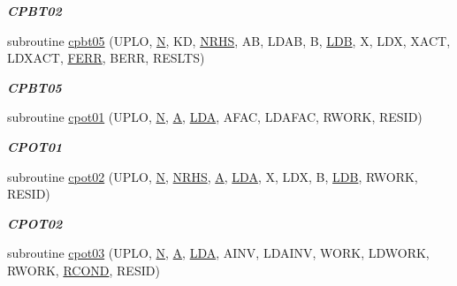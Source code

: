 \begin{DoxyCompactItemize}
\begin{DoxyCompactList}\small\item\em {\bfseries C\+P\+B\+T02} \end{DoxyCompactList}\item 
subroutine \hyperlink{group__complex__lin_gad208935300b83a1e0a41843d6a3c6e70}{cpbt05} (U\+P\+L\+O, \hyperlink{polmisc_8c_a0240ac851181b84ac374872dc5434ee4}{N}, K\+D, \hyperlink{example__user_8c_aa0138da002ce2a90360df2f521eb3198}{N\+R\+H\+S}, A\+B, L\+D\+A\+B, B, \hyperlink{example__user_8c_a50e90a7104df172b5a89a06c47fcca04}{L\+D\+B}, X, L\+D\+X, X\+A\+C\+T, L\+D\+X\+A\+C\+T, \hyperlink{superlu__enum__consts_8h_af00a42ecad444bbda75cde1b64bd7e72a78fd14d7abebae04095cfbe02928f153}{F\+E\+R\+R}, B\+E\+R\+R, R\+E\+S\+L\+T\+S)
\begin{DoxyCompactList}\small\item\em {\bfseries C\+P\+B\+T05} \end{DoxyCompactList}\item 
subroutine \hyperlink{group__complex__lin_gac0f7f42f082b011a90f1d7cc56c678ff}{cpot01} (U\+P\+L\+O, \hyperlink{polmisc_8c_a0240ac851181b84ac374872dc5434ee4}{N}, \hyperlink{classA}{A}, \hyperlink{example__user_8c_ae946da542ce0db94dced19b2ecefd1aa}{L\+D\+A}, A\+F\+A\+C, L\+D\+A\+F\+A\+C, R\+W\+O\+R\+K, R\+E\+S\+I\+D)
\begin{DoxyCompactList}\small\item\em {\bfseries C\+P\+O\+T01} \end{DoxyCompactList}\item 
subroutine \hyperlink{group__complex__lin_gac7f9b8b1f1434238c1f457ef57f0ff9f}{cpot02} (U\+P\+L\+O, \hyperlink{polmisc_8c_a0240ac851181b84ac374872dc5434ee4}{N}, \hyperlink{example__user_8c_aa0138da002ce2a90360df2f521eb3198}{N\+R\+H\+S}, \hyperlink{classA}{A}, \hyperlink{example__user_8c_ae946da542ce0db94dced19b2ecefd1aa}{L\+D\+A}, X, L\+D\+X, B, \hyperlink{example__user_8c_a50e90a7104df172b5a89a06c47fcca04}{L\+D\+B}, R\+W\+O\+R\+K, R\+E\+S\+I\+D)
\begin{DoxyCompactList}\small\item\em {\bfseries C\+P\+O\+T02} \end{DoxyCompactList}\item 
subroutine \hyperlink{group__complex__lin_ga3b00fa25f93b2a1a0a21fa1aa48e628c}{cpot03} (U\+P\+L\+O, \hyperlink{polmisc_8c_a0240ac851181b84ac374872dc5434ee4}{N}, \hyperlink{classA}{A}, \hyperlink{example__user_8c_ae946da542ce0db94dced19b2ecefd1aa}{L\+D\+A}, A\+I\+N\+V, L\+D\+A\+I\+N\+V, W\+O\+R\+K, L\+D\+W\+O\+R\+K, R\+W\+O\+R\+K, \hyperlink{superlu__enum__consts_8h_af00a42ecad444bbda75cde1b64bd7e72a9b5c151728d8512307565994c89919d5}{R\+C\+O\+N\+D}, R\+E\+S\+I\+D)

\end{DoxyCompactItemize}

